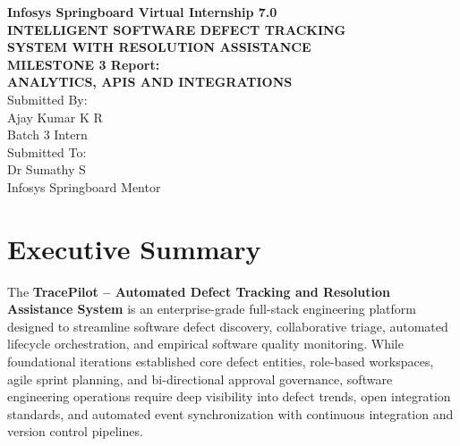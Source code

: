 \documentclass[11pt,a4paper]{article}
\begin{document}
\begin{titlepage}
    \thispagestyle{empty}
    \centering
    \vspace*{3.5cm}

    {\large \textbf{\textcolor{infosysblue}{Infosys Springboard Virtual Internship 7.0}}}\\[2.2cm]

    {\Large \textbf{INTELLIGENT SOFTWARE DEFECT TRACKING\\[0.3em]
    SYSTEM WITH RESOLUTION ASSISTANCE}}\\[2.5cm]

    {\normalsize \textbf{MILESTONE 3 Report:}}\\[0.4em]
    {\normalsize \textbf{ANALYTICS, APIS AND INTEGRATIONS}}\\[4cm]

    {\small Submitted By:}\\[0.3em]
    {\normalsize Ajay Kumar K R}\\[0.2em]
    {\small Batch 3 Intern}\\[1.6cm]

    {\small Submitted To:}\\[0.3em]
    {\normalsize Dr Sumathy S}\\[0.2em]
    {\small Infosys Springboard Mentor}

    \vfill
\end{titlepage}

\newpage

\section{Executive Summary}
The \textbf{TracePilot -- Automated Defect Tracking and Resolution Assistance System} is an enterprise-grade full-stack engineering platform designed to streamline software defect discovery, collaborative triage, automated lifecycle orchestration, and empirical software quality monitoring. While foundational iterations established core defect entities, role-based workspaces, agile sprint planning, and bi-directional approval governance, software engineering operations require deep visibility into defect trends, open integration standards, and automated event synchronization with continuous integration and version control pipelines.
\end{document}

